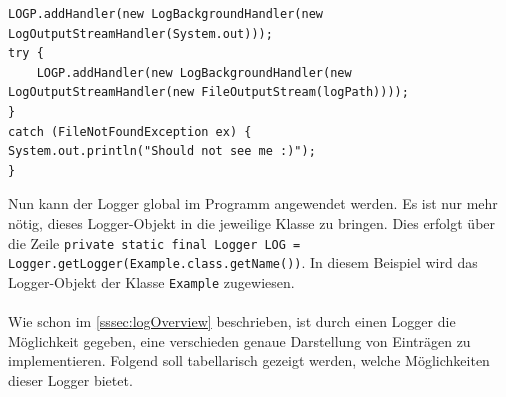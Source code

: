 \begin{lstlisting}[style=java,caption=Java-Codebeispiel,label=loggerOutput]
LOGP.addHandler(new LogBackgroundHandler(new LogOutputStreamHandler(System.out)));
try {
    LOGP.addHandler(new LogBackgroundHandler(new LogOutputStreamHandler(new FileOutputStream(logPath))));
}
catch (FileNotFoundException ex) {
System.out.println("Should not see me :)");
}
\end{lstlisting}
Nun kann der Logger global im Programm angewendet werden.
Es ist nur mehr nötig, dieses Logger-Objekt in die jeweilige Klasse zu bringen.
Dies erfolgt über die Zeile \lstinline[style=java]{private static final Logger LOG = Logger.getLogger(Example.class.getName())}.
In diesem Beispiel wird das Logger-Objekt der Klasse \lstinline[style=java]{Example} zugewiesen.\\\\
Wie schon im \autoref{sssec:logOverview} beschrieben, ist durch einen Logger die Möglichkeit gegeben, eine verschieden genaue Darstellung von Einträgen zu implementieren.
Folgend soll tabellarisch gezeigt werden, welche Möglichkeiten dieser Logger bietet.
